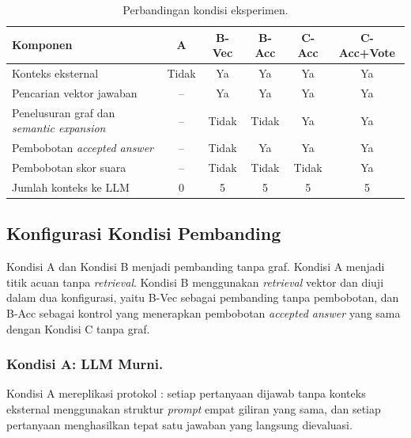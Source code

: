 \begin{table}[!htbp]
\centering
\caption{Perbandingan kondisi eksperimen.}
\label{tab:perbandingan-kondisi}
\small
\begin{tabular}{|l|c|c|c|c|c|}
\hline
\textbf{Komponen} & \textbf{A} & \textbf{B-Vec} & \textbf{B-Acc} & \textbf{C-Acc} & \textbf{C-Acc+Vote} \\
\hline
Konteks eksternal & Tidak & Ya & Ya & Ya & Ya \\
Pencarian vektor jawaban & -- & Ya & Ya & Ya & Ya \\
Penelusuran graf dan \emph{semantic expansion} & -- & Tidak & Tidak & Ya & Ya \\
Pembobotan \emph{accepted answer} & -- & Tidak & Ya & Ya & Ya \\
Pembobotan skor suara & -- & Tidak & Tidak & Tidak & Ya \\
Jumlah konteks ke LLM & 0 & 5 & 5 & 5 & 5 \\
\hline
\end{tabular}
\end{table}

\subsection{Konfigurasi Kondisi Pembanding}
\label{subsec:kondisi-pembanding}

Kondisi A dan Kondisi B menjadi pembanding tanpa graf. Kondisi A menjadi titik acuan tanpa \emph{retrieval}. Kondisi B menggunakan \emph{retrieval} vektor dan diuji dalam dua konfigurasi, yaitu B-Vec sebagai pembanding tanpa pembobotan, dan B-Acc sebagai kontrol yang menerapkan pembobotan \emph{accepted answer} yang sama dengan Kondisi C tanpa graf.

\subsubsection{Kondisi A: LLM Murni.}
Kondisi A mereplikasi protokol \textcite{DaSilva2025}: setiap pertanyaan dijawab tanpa konteks eksternal menggunakan struktur \emph{prompt} empat giliran yang sama, dan setiap pertanyaan menghasilkan tepat satu jawaban yang langsung dievaluasi.

